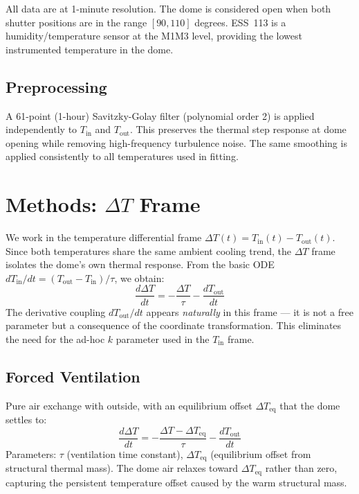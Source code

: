 \documentclass[11pt]{article}
\begin{document}
All data are at 1-minute resolution. The dome is considered open when both shutter positions are in the range $[90, 110]$ degrees. ESS~113 is a humidity/temperature sensor at the M1M3 level, providing the lowest instrumented temperature in the dome.

\subsection{Preprocessing}

A 61-point (1-hour) Savitzky-Golay filter (polynomial order 2) is applied independently to $T_\mathrm{in}$ and $T_\mathrm{out}$. This preserves the thermal step response at dome opening while removing high-frequency turbulence noise. The same smoothing is applied consistently to all temperatures used in fitting.

\section{Methods: $\Delta T$ Frame}

We work in the temperature differential frame $\Delta T(t) = T_\mathrm{in}(t) - T_\mathrm{out}(t)$. Since both temperatures share the same ambient cooling trend, the $\Delta T$ frame isolates the dome's own thermal response. From the basic ODE $dT_\mathrm{in}/dt = (T_\mathrm{out} - T_\mathrm{in})/\tau$, we obtain:
\begin{equation}
    \frac{d\Delta T}{dt} = -\frac{\Delta T}{\tau} - \frac{dT_\mathrm{out}}{dt}
\end{equation}
The derivative coupling $dT_\mathrm{out}/dt$ appears \emph{naturally} in this frame --- it is not a free parameter but a consequence of the coordinate transformation. This eliminates the need for the ad-hoc $k$ parameter used in the $T_\mathrm{in}$ frame.

\subsection{Forced Ventilation}

Pure air exchange with outside, with an equilibrium offset $\Delta T_\mathrm{eq}$ that the dome settles to:
\begin{equation}
    \frac{d\Delta T}{dt} = -\frac{\Delta T - \Delta T_\mathrm{eq}}{\tau} - \frac{dT_\mathrm{out}}{dt}
    \label{eq:forced_offset}
\end{equation}
Parameters: $\tau$ (ventilation time constant), $\Delta T_\mathrm{eq}$ (equilibrium offset from structural thermal mass). The dome air relaxes toward $\Delta T_\mathrm{eq}$ rather than zero, capturing the persistent temperature offset caused by the warm structural mass.
\end{document}
